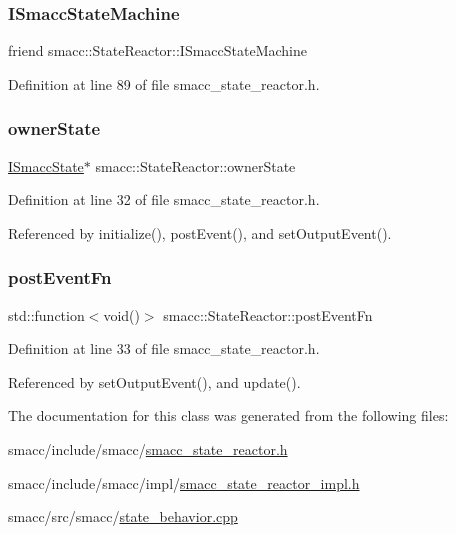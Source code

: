 \subsubsection{\texorpdfstring{I\+Smacc\+State\+Machine}{ISmaccStateMachine}}
{\footnotesize\ttfamily friend smacc\+::\+State\+Reactor\+::\+I\+Smacc\+State\+Machine\hspace{0.3cm}{\ttfamily [private]}}



Definition at line 89 of file smacc\+\_\+state\+\_\+reactor.\+h.

\mbox{\label{classsmacc_1_1StateReactor_aabd30af9412a8fea9ec5906f173d9d4a}} 
\subsubsection{\texorpdfstring{owner\+State}{ownerState}}
{\footnotesize\ttfamily \hyperlink{classsmacc_1_1ISmaccState}{I\+Smacc\+State}$\ast$ smacc\+::\+State\+Reactor\+::owner\+State}



Definition at line 32 of file smacc\+\_\+state\+\_\+reactor.\+h.



Referenced by initialize(), post\+Event(), and set\+Output\+Event().

\mbox{\label{classsmacc_1_1StateReactor_a1d97ae5c1689b6716c60c19c94a7eeae}} 
\subsubsection{\texorpdfstring{post\+Event\+Fn}{postEventFn}}
{\footnotesize\ttfamily std\+::function$<$void()$>$ smacc\+::\+State\+Reactor\+::post\+Event\+Fn}



Definition at line 33 of file smacc\+\_\+state\+\_\+reactor.\+h.



Referenced by set\+Output\+Event(), and update().



The documentation for this class was generated from the following files\+:\begin{DoxyCompactItemize}
\item 
smacc/include/smacc/\hyperlink{smacc__state__reactor_8h}{smacc\+\_\+state\+\_\+reactor.\+h}\item 
smacc/include/smacc/impl/\hyperlink{smacc__state__reactor__impl_8h}{smacc\+\_\+state\+\_\+reactor\+\_\+impl.\+h}\item 
smacc/src/smacc/\hyperlink{state__behavior_8cpp}{state\+\_\+behavior.\+cpp}\end{DoxyCompactItemize}

